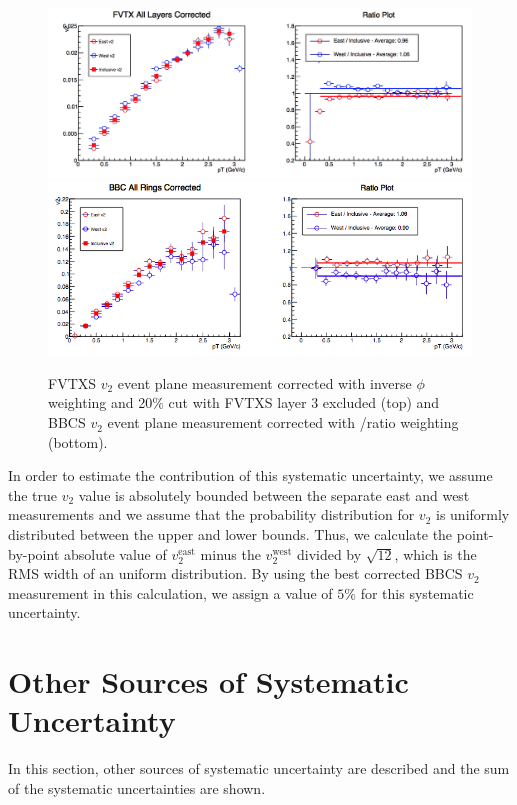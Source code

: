 \begin{figure}[!h]
\begin{center}
\includegraphics[width=0.75\linewidth]{figs/fvtx_corrected.png}
\includegraphics[width=0.75\linewidth]{figs/bbc_pp_correction.png}
\caption{ FVTXS $v_2$ event plane measurement corrected with inverse $\phi$ weighting and 20$\%$ cut with FVTXS layer 3 excluded (top) and BBCS $v_2$ event plane measurement corrected with \pp/\pau ratio weighting (bottom).}
\label{fig:fvtx_corrected_best}
\end{center}
\end{figure}

In order to estimate the contribution of this systematic uncertainty, we assume the true $v_2$ value is absolutely bounded between the separate east and west measurements and we assume that the probability distribution for $v_2$ is uniformly distributed between the upper and lower bounds. Thus, we calculate the point-by-point absolute value of $v_2^{\textrm{east}}$ minus the $v_2^{\textrm{west}}$ divided by $\sqrt{12}$, which is the RMS width of an uniform distribution. By using the best corrected BBCS $v_2$ measurement in this calculation, we assign a value of $5\%$ for this systematic uncertainty.


\section{Other Sources of Systematic Uncertainty}
In this section, other sources of systematic uncertainty are described and the sum of the systematic uncertainties are shown.
